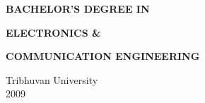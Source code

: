 \begin{titlepage}
    \begin{center}
        \vspace*{4cm}
        
     
        \textbf{\LARGE{\uppercase{Bachelor's degree in}}}
        
        \vspace{1cm}
        \textbf{\LARGE{\uppercase{Electronics \& }}}
        
        \vspace{1cm}
        \textbf{\LARGE{\uppercase{Communication Engineering}}}
        
        \vspace*{4cm}
    \large{Tribhuvan University} \\
    \large{2009}
    \end{center}
    
\end{titlepage}